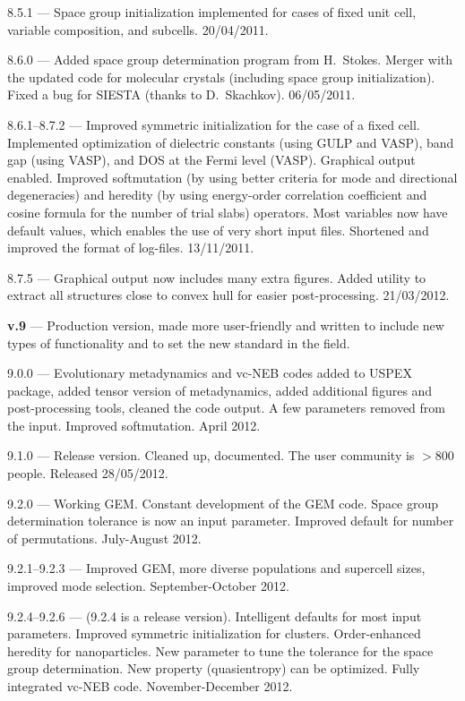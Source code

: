 \documentclass[12pt]{article}
\begin{document}
{8.5.1 --- Space group initialization implemented for cases of fixed unit cell,
variable composition, and subcells. 20/04/2011.

8.6.0 --- Added space group determination program from H.~Stokes. Merger with
the updated code for molecular crystals (including space group initialization).
Fixed a bug for SIESTA (thanks to D.~Skachkov). 06/05/2011.

8.6.1--8.7.2 --- Improved symmetric initialization for the case of a fixed cell.
Implemented optimization of dielectric constants (using GULP and VASP), band gap
(using VASP), and DOS at the Fermi level (VASP). Graphical output enabled.
Improved softmutation (by using better criteria for mode and directional
degeneracies) and heredity (by using energy-order correlation coefficient and
cosine formula for the number of trial slabs) operators. Most variables now have
default values, which enables the use of very short input files. Shortened and
improved the format of log-files. 13/11/2011.

8.7.5 --- Graphical output now includes many extra figures. Added utility to
extract all structures close to convex hull for easier post-processing.
21/03/2012.

\textbf{v.9} --- Production version, made more user-friendly and written to
include new types of functionality and to set the new standard in the field.

9.0.0 --- Evolutionary metadynamics and vc-NEB codes added to USPEX package,
added tensor version of metadynamics, added additional figures and
post-processing tools, cleaned the code output. A few parameters removed from
the input. Improved softmutation. April 2012.

9.1.0 --- Release version. Cleaned up, documented. The user community is $>$800
people. Released 28/05/2012.

9.2.0 --- Working GEM. Constant development of the GEM code. Space group
determination tolerance is now an input parameter. Improved default for number
of permutations. July-August 2012.

9.2.1--9.2.3 --- Improved GEM, more diverse populations and supercell sizes,
improved mode selection. September-October 2012.

9.2.4--9.2.6 --- (9.2.4 is a release version). Intelligent defaults for most
input parameters. Improved symmetric initialization for clusters. Order-enhanced
heredity for nanoparticles. New parameter to tune the tolerance for the space
group determination. New property (quasientropy) can be optimized. Fully
integrated vc-NEB code. November-December 2012.

}
\end{document}
